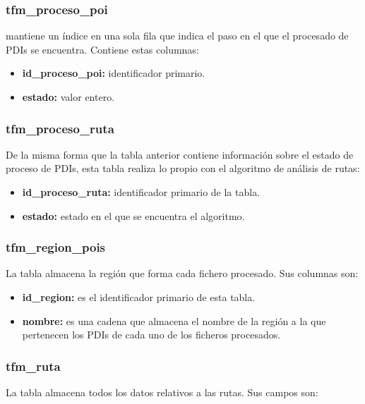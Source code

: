 \subsubsection{tfm\_proceso\_poi}
 mantiene un índice en una sola fila que indica el paso en el que el procesado de PDIs se encuentra. Contiene estas columnas:

\begin{itemize}
	\item \textbf{id\_proceso\_poi:} identificador primario.
	\item \textbf{estado:} valor entero.
\end{itemize}

\subsubsection{tfm\_proceso\_ruta}
De la misma forma que la tabla anterior contiene información sobre el estado de proceso de PDIs, esta tabla realiza lo propio con el algoritmo de análisis de rutas:

\begin{itemize}
	\item \textbf{id\_proceso\_ruta:} identificador primario de la tabla.
	\item \textbf{estado:} estado en el que se encuentra el algoritmo.
\end{itemize}

\subsubsection{tfm\_region\_pois}
La tabla  almacena la región que forma cada fichero procesado. Sus columnas son:

\begin{itemize}
	\item \textbf{id\_region:} es el identificador primario de esta tabla.
	\item \textbf{nombre:} es una cadena que almacena el nombre de la región a la que pertenecen los PDIs de cada uno de los ficheros procesados.
\end{itemize}

\subsubsection{tfm\_ruta}
La tabla  almacena todos los datos relativos a las rutas. Sus campos son:

